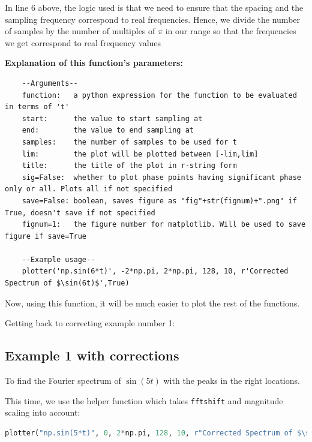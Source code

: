 \documentclass[12pt]{article}
\begin{document}
In line 6 above, the logic used is that we need to ensure that the spacing and the sampling frequency correspond to real frequencies. Hence, we divide the number of samples by the number of multiples of $\pi$ in our range so that the frequencies we get correspond to real frequency values

\textbf{Explanation of this function's parameters:}
\begin{lstlisting}
    --Arguments--
    function:   a python expression for the function to be evaluated in terms of 't'
    start:      the value to start sampling at
    end:        the value to end sampling at
    samples:    the number of samples to be used for t
    lim:        the plot will be plotted between [-lim,lim]
    title:      the title of the plot in r-string form
    sig=False:  whether to plot phase points having significant phase only or all. Plots all if not specified
    save=False: boolean, saves figure as "fig"+str(fignum)+".png" if True, doesn't save if not specified
    fignum=1:   the figure number for matplotlib. Will be used to save figure if save=True

    --Example usage--
    plotter('np.sin(6*t)', -2*np.pi, 2*np.pi, 128, 10, r'Corrected Spectrum of $\sin(6t)$',True)
\end{lstlisting}

Now, using this function, it will be much easier to plot the rest of the functions.

Getting back to correcting example number 1:
\subsection{Example 1 with corrections}

To find the Fourier spectrum of $\sin(5t)$ with the peaks in the right locations.

This time, we use the helper function which takes \texttt{fftshift} and magnitude scaling into account:

\begin{lstlisting}[language=Python]
plotter("np.sin(5*t)", 0, 2*np.pi, 128, 10, r"Corrected Spectrum of $\sin(5t)$",save=True, fignum=1)
\end{lstlisting}
\end{document}
